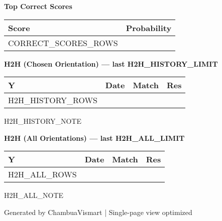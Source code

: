 \documentclass[a4paper,10pt]{article}
\begin{document}
\vspace{0.1em}
{\scriptsize\textbf{\textcolor{teamA}{Top Correct Scores}}}
{\scriptsize
{}
\begin{tabular}{L{0.4\textwidth}L{0.2\textwidth}}
  \toprule
  Score & Probability \\
  \midrule
  {{CORRECT_SCORES_ROWS}}
  \bottomrule
\end{tabular}}

\vspace{0.1em}
{\scriptsize\textbf{\textcolor{teamA}{H2H (Chosen Orientation) — last {{H2H_HISTORY_LIMIT}}}}}
{\scriptsize
{}
\begin{tabular}{L{0.8cm}L{1.4cm}L{12.5cm}L{1.2cm}}
  \toprule
  Y & Date & Match & Res \\
  \midrule
  {{H2H_HISTORY_ROWS}}
  \bottomrule
\end{tabular}}
{\tiny {{H2H_HISTORY_NOTE}}}

\vspace{0.1em}
{\scriptsize\textbf{\textcolor{teamB}{H2H (All Orientations) — last {{H2H_ALL_LIMIT}}}}}
{\scriptsize
{}
\begin{tabular}{L{0.8cm}L{1.4cm}L{12.5cm}L{1.2cm}}
  \toprule
  Y & Date & Match & Res \\
  \midrule
  {{H2H_ALL_ROWS}}
  \bottomrule
\end{tabular}}
{\tiny {{H2H_ALL_NOTE}}}

\vspace{0.2em}
{\centering \tiny Generated by ChambuaVismart | Single-page view optimized\par}
\end{document}
